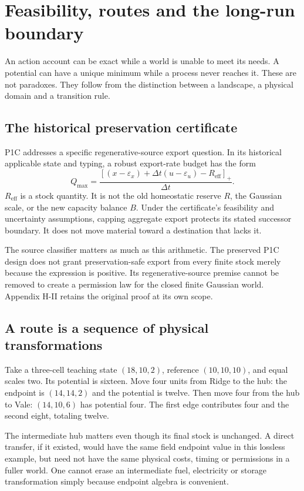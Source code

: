 \chapter{Feasibility, routes and the long-run boundary}\label{ch:longrun}
An action account can be exact while a world is unable to meet its needs.
A potential can have a unique minimum while a process never reaches it.
These are not paradoxes. They follow from the distinction between a
landscape, a physical domain and a transition rule.

\section{The historical preservation certificate}
P1C addresses a specific regenerative-source export question. In its
historical applicable state and typing, a robust export-rate budget has the
form
\begin{equation}
 Q_{\max}=\frac{[(x-\varepsilon_x)+\Delta t(u-\varepsilon_u)
                      -R_{\mathrm{eff}}]_+}{\Delta t}.
\end{equation}
$R_{\mathrm{eff}}$ is a stock quantity. It is not the old homeostatic
reserve $R$, the Gaussian scale, or the new capacity balance $B$. Under
the certificate's feasibility and uncertainty assumptions, capping aggregate
export protects its stated successor boundary. It does not move material
toward a destination that lacks it.

The source classifier matters as much as this arithmetic. The preserved
P1C design does not grant preservation-safe export from every finite stock
merely because the expression is positive. Its regenerative-source premise
cannot be removed to create a permission law for the closed finite Gaussian
world. Appendix H-II retains the original proof at its own scope.

\section{A route is a sequence of physical transformations}
Take a three-cell teaching state $(18,10,2)$, reference $(10,10,10)$,
and equal scales two. Its potential is sixteen. Move four units from
Ridge to the hub: the endpoint is $(14,14,2)$ and the potential is twelve.
Then move four from the hub to Vale: $(14,10,6)$ has potential four.
The first edge contributes four and the second eight, totaling twelve.

The intermediate hub matters even though its final stock is unchanged.
A direct transfer, if it existed, would have the same field endpoint value
in this lossless example, but need not have the same physical costs, timing
or permissions in a fuller world. One cannot erase an intermediate fuel,
electricity or storage transformation simply because endpoint algebra is
convenient.


